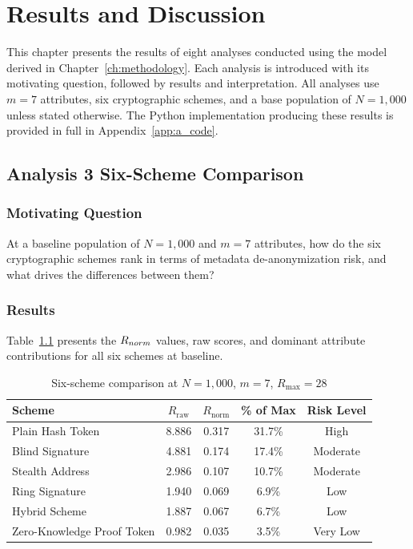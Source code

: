 \chapter{Results and Discussion}
\label{ch:results}

This chapter presents the results of eight analyses conducted
using the model derived in Chapter~\ref{ch:methodology}. Each
analysis is introduced with its motivating question, followed
by results and interpretation. All analyses use $m = 7$
attributes, six cryptographic schemes, and a base population
of $N = 1{,}000$ unless stated otherwise. The Python
implementation producing these results is provided in full
in Appendix~\ref{app:a_code}.
\section{Analysis 3 Six-Scheme Comparison}\label{sec:a3}

\subsection{Motivating Question}

At a baseline population of $N = 1{,}000$ and $m = 7$
attributes, how do the six cryptographic schemes rank in terms
of metadata de-anonymization risk, and what drives the
differences between them?

\subsection{Results}

Table~\ref{tab:a3_results} presents the $R_{norm}$ values,
raw scores, and dominant attribute contributions for all six
schemes at baseline.

\begin{table}[H]
\centering
\caption{Six-scheme comparison at $N = 1{,}000$, $m = 7$,
$R_{\mathrm{max}} = 28$}
\label{tab:a3_results}
\begin{tabular}{lcccc}
\toprule
\textbf{Scheme} & \textbf{$R_{\mathrm{raw}}$} &
\textbf{$R_{\mathrm{norm}}$} &
\textbf{\% of Max} & \textbf{Risk Level}\\
\midrule
Plain Hash Token  & 8.886 & 0.317 & 31.7\% & High\\
Blind Signature   & 4.881 & 0.174 & 17.4\% & Moderate\\
Stealth Address   & 2.986 & 0.107 & 10.7\% & Moderate\\
Ring Signature    & 1.940 & 0.069 & 6.9\%  & Low\\
Hybrid Scheme     & 1.887 & 0.067 & 6.7\%  & Low\\
Zero-Knowledge Proof Token         & 0.982 & 0.035 & 3.5\%  & Very Low\\
\bottomrule
\end{tabular}
\end{table}

